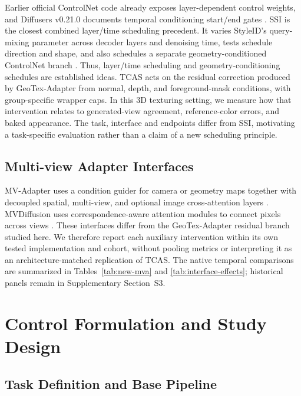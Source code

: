 \documentclass[times,twocolumn,final]{elsarticle}
\begin{document}
Earlier official ControlNet code already exposes layer-dependent control weights, and Diffusers v0.21.0 documents temporal conditioning start/end gates \cite{controlnet2023layercontrol,diffusers2023controlnet}. SSI is the closest combined layer/time scheduling precedent. It varies StyleID's query-mixing parameter \cite{chung2024styleid} across decoder layers and denoising time, tests schedule direction and shape, and also schedules a separate geometry-conditioned ControlNet branch \cite{kulkarni2026ssi}. Thus, layer/time scheduling and geometry-conditioning schedules are established ideas. TCAS acts on the residual correction produced by GeoTex-Adapter from normal, depth, and foreground-mask conditions, with group-specific wrapper caps. In this 3D texturing setting, we measure how that intervention relates to generated-view agreement, reference-color errors, and baked appearance. The task, interface and endpoints differ from SSI, motivating a task-specific evaluation rather than a claim of a new scheduling principle.

\subsection{Multi-view Adapter Interfaces}
\label{subsec:mvinterfaces}

MV-Adapter uses a condition guider for camera or geometry maps together with decoupled spatial, multi-view, and optional image cross-attention layers \cite{huang2024mvadapter}. MVDiffusion uses correspondence-aware attention modules to connect pixels across views \cite{tang2023mvdiffusion}. These interfaces differ from the GeoTex-Adapter residual branch studied here. We therefore report each auxiliary intervention within its own tested implementation and cohort, without pooling metrics or interpreting it as an architecture-matched replication of TCAS. The native temporal comparisons are summarized in Tables~\ref{tab:new-mva} and \ref{tab:interface-effects}; historical panels remain in Supplementary Section~S3.

\section{Control Formulation and Study Design}
\label{sec:method}

\subsection{Task Definition and Base Pipeline}
\label{subsec:task}
\end{document}
